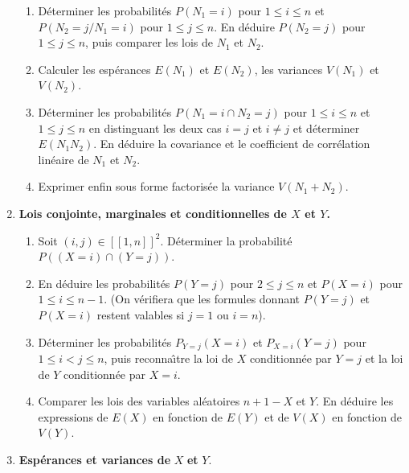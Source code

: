 \begin{enumerate}
\begin{enumerate}
\item D\'eterminer les probabilit\'es $P(N_{1}=i)$ pour $1\leqslant i\leqslant n$
et $P(N_{2}=j/N_{1}=i)$ pour $1\leqslant j\leqslant n$.\newline
En d\'eduire $P(N_{2}=j)$ pour $1\leqslant j\leqslant n$, puis comparer les
lois de $N_{1}$ et $N_{2}$.

\item Calculer les esp\'erances $E(N_{1})$ et $E(N_{2})$, les variances $%
V(N_{1})$ et $V(N_{2})$.

\item D\'eterminer les probabilit\'es $P(N_{1}=i\cap N_{2}=j)$ pour $1\leqslant
i\leqslant n$ et $1\leqslant j\leqslant n$ en distinguant les deux cas $i=j$
et $i\neq j$ et déterminer
$ E(N_{1}N_{2})$.
En d\'eduire la covariance et le coefficient de corr\'elation lin\'eaire de $N_{1}$
et $N_{2}$.

\item Exprimer enfin sous forme factoris\'ee la variance $V(N_{1}+N_{2})$.
\end{enumerate}

\item \textbf{Lois conjointe, marginales et conditionnelles de $X$ et $Y$.}

\begin{enumerate}
\item Soit $(i,j)\in[\![1,n]\!]^2$. Déterminer la probabilit\'e $P((X=i)\cap (Y=j))$.  

\item En d\'eduire les probabilit\'es $P(Y=j)$ pour $2\leqslant j\leqslant n$ et 
$P(X=i)$ pour $1\leqslant i\leqslant n-1$.\newline
(On v\'erifiera que les formules donnant $P(Y=j)$ et $P(X=i)$ restent valables
si $j=1$ ou $i=n$).

\item D\'eterminer les probabilit\'es $P_{Y=j}(X=i)$ et $P_{X=i}(Y=j)$ pour $%
1\leqslant i<j\leqslant n$, puis reconna\^\i tre la loi de $X$ conditionn\'ee par $%
Y=j$ et la loi de $Y$ conditionn\'ee par $X=i.$

\item Comparer les lois des variables al\'eatoires $n+1-X$ et $Y$.
En  d\'eduire les
expressions de $E(X)$ en fonction de $E(Y)$ et de $V(X)$ en fonction de $V(Y)
$.
\end{enumerate}

\item \textbf{Esp\'erances et variances de }$X$\textbf{ et }$Y$.


\end{enumerate}
